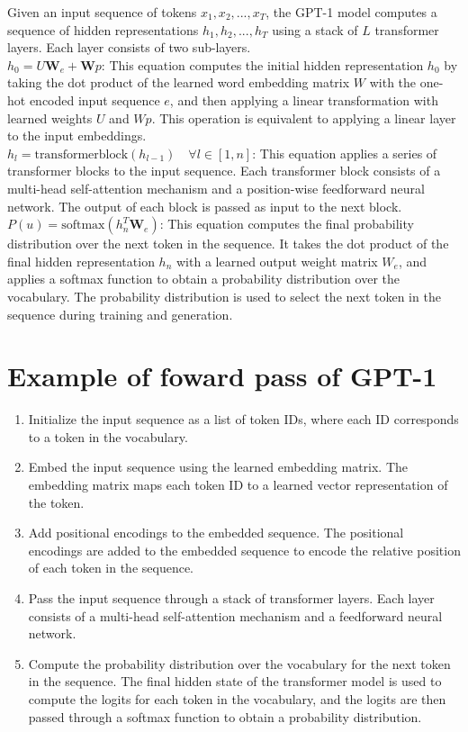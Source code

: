 \documentclass[
	11pt,
	a4paper,
	figtabcapt,
]{oblivoir}
\begin{document}
	
Given an input sequence of tokens ${x_1, x_2, ..., x_T}$, the GPT-1 model computes a sequence of hidden representations ${h_1, h_2, ..., h_T}$ using a stack of $L$ transformer layers. Each layer consists of two sub-layers.\\
$h_0 = U \textbf{W}_e + \textbf{W}p $: This equation computes the initial hidden representation $h_0$ by taking the dot product of the learned word embedding matrix $W$ with the one-hot encoded input sequence $e$, and then applying a linear transformation with learned weights $U$ and $Wp$. This operation is equivalent to applying a linear layer to the input embeddings.\\
$h_l = \text{transformerblock}(h_{l-1}) \quad \forall l \in [1, n]$: This equation applies a series of transformer blocks to the input sequence. Each transformer block consists of a multi-head self-attention mechanism and a position-wise feedforward neural network. The output of each block is passed as input to the next block. \\
$P(u) = \text{softmax}(h_n^T \textbf{W}_e)$: This equation computes the final probability distribution over the next token in the sequence. It takes the dot product of the final hidden representation $h_n$ with a learned output weight matrix $W_e$, and applies a softmax function to obtain a probability distribution over the vocabulary. The probability distribution is used to select the next token in the sequence during training and generation.

\section{Example of foward pass of GPT-1}

\begin{enumerate}
	\item Initialize the input sequence as a list of token IDs, where each ID corresponds to a token in the vocabulary.
	\item Embed the input sequence using the learned embedding matrix. The embedding matrix maps each token ID to a learned vector representation of the token.
	\item Add positional encodings to the embedded sequence. The positional encodings are added to the embedded sequence to encode the relative position of each token in the sequence.
	\item Pass the input sequence through a stack of transformer layers. Each layer consists of a multi-head self-attention mechanism and a feedforward neural network.
	\item Compute the probability distribution over the vocabulary for the next token in the sequence. The final hidden state of the transformer model is used to compute the logits for each token in the vocabulary, and the logits are then passed through a softmax function to obtain a probability distribution.
\end{enumerate}
\end{document}
